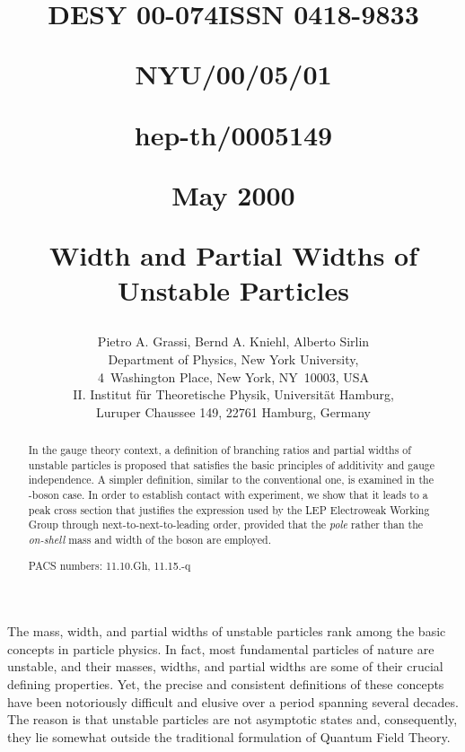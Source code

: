\documentclass[a4paper,12pt]{article}
\begin{document}
\title{\vskip-3cm{\baselineskip12pt
\centerline{\normalsize DESY 00-074\hfill ISSN 0418-9833}
\centerline{\normalsize NYU/00/05/01\hfill}
\centerline{\normalsize hep-th/0005149\hfill}
\centerline{\normalsize May 2000\hfill}}
\vskip1.5cm 
Width and Partial Widths of Unstable Particles}
\author{{\sc Pietro A. Grassi,\coordHE{} Bernd A. Kniehl,\coordHE{} Alberto Sirlin\coordHE{}}\\
{\normalsize {}\coordHE{} Department of Physics, New York University,}\\
{\normalsize 4~Washington Place, New York, NY~10003, USA}\\
{\normalsize {}\coordHE{} II. Institut f\"ur Theoretische Physik, Universit\"at
Hamburg,}\\
{\normalsize Luruper Chaussee 149, 22761 Hamburg, Germany}}

\date{}

\maketitle
\thispagestyle{empty}

\begin{abstract}
In the gauge theory context, a definition of branching ratios and partial
widths of unstable particles is proposed that satisfies the basic principles
of additivity and gauge independence.
A simpler definition, similar to the conventional one, is examined in the
\coordHE{}-boson case. In order to establish contact with experiment, we show that 
it leads to a peak cross section that justifies the expression used by the
LEP Electroweak Working Group through next-to-next-to-leading order, provided
that the {\it pole} rather than the {\it on-shell} mass and width of the \coordHE{}
boson are employed.

\medskip

\noindent
PACS numbers: 11.10.Gh, 11.15.-q
\end{abstract}

\newpage

The mass, width, and partial widths of unstable particles rank among the basic
concepts in particle physics.
In fact, most fundamental particles of nature are unstable, and their masses,
widths, and partial widths are some of their crucial defining properties. 
Yet, the precise and consistent definitions of these concepts have been
notoriously difficult and elusive over a period spanning several decades.
The reason is that unstable particles are not asymptotic states and,
consequently, they lie somewhat outside the traditional formulation of Quantum
Field Theory.
\end{document}
